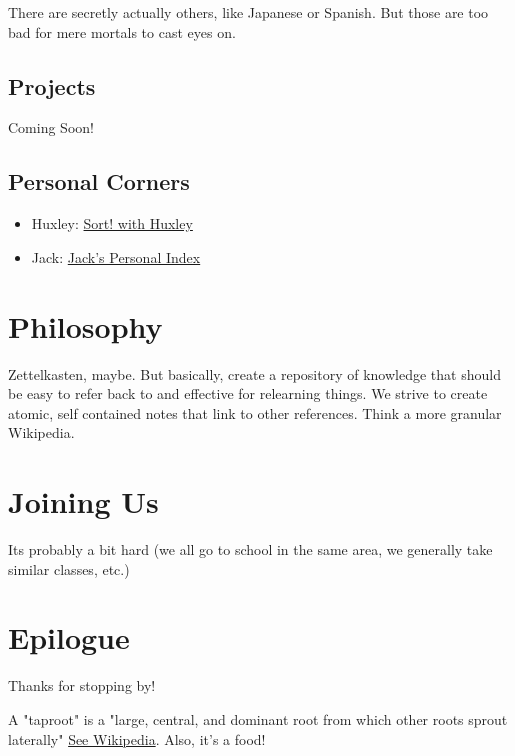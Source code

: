 \documentclass[letterpaper]{article}
\begin{document}
There are secretly actually others, like Japanese or Spanish. But those are too bad for mere mortals to cast eyes on.

\subsection{Projects}
\label{sec:orgf3d2643}
Coming Soon!

\subsection{Personal Corners}
\label{sec:orgd894bf7}
\begin{itemize}
\item Huxley: \href{corners/huxley/KBxSort.org}{Sort! with Huxley}
\item Jack: \href{corners/jack/index.org}{Jack's Personal Index}
\end{itemize}

\section{Philosophy}
\label{sec:org2a606b9}
Zettelkasten, maybe. But basically, create a repository of knowledge that should be easy to refer back to and effective for relearning things.
We strive to create atomic, self contained notes that link to other references. Think a more granular Wikipedia.

\section{Joining Us}
\label{sec:org38dbc8c}
Its probably a bit hard (we all go to school in the same area, we generally take similar classes, etc.)

\section{Epilogue}
\label{sec:org549a55e}
Thanks for stopping by!

A "taproot" is a "large, central, and dominant root from which other roots sprout laterally" \href{https://en.wikipedia.org/wiki/Taproot}{See Wikipedia}. Also, it's a food!
\end{document}
